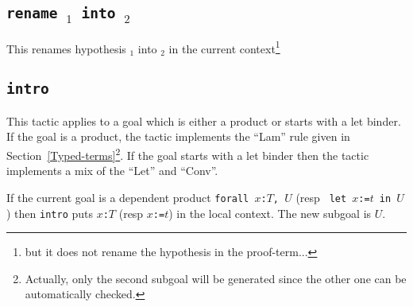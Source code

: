 \begin{ErrMsgs}

\item {}

\item {}

\item {}

\end{ErrMsgs}

\subsection{\tt rename {\ident$_1$} into {\ident$_2$}
}

This renames hypothesis {\ident$_1$} into {\ident$_2$} in the current
context\footnote{but it does not rename the hypothesis in the
  proof-term...}

\begin{ErrMsgs}

\item {}

\item {}

\end{ErrMsgs}

\subsection{\tt intro
\label{intro}}

This tactic applies to a goal which is either a product or starts with
a let binder. If the goal is a product, the tactic implements the
``Lam'' rule given in
Section~\ref{Typed-terms}\footnote{Actually, only the second subgoal will be
generated since the other one can be automatically checked.}.  If the
goal starts with a let binder then the tactic implements a mix of the
``Let'' and ``Conv''.

If the current goal is a dependent product {\tt forall $x$:$T$, $U$} (resp {\tt
let $x$:=$t$ in $U$}) then {\tt intro} puts {\tt $x$:$T$} (resp {\tt $x$:=$t$})
 in the local context.
The new subgoal is $U$.

